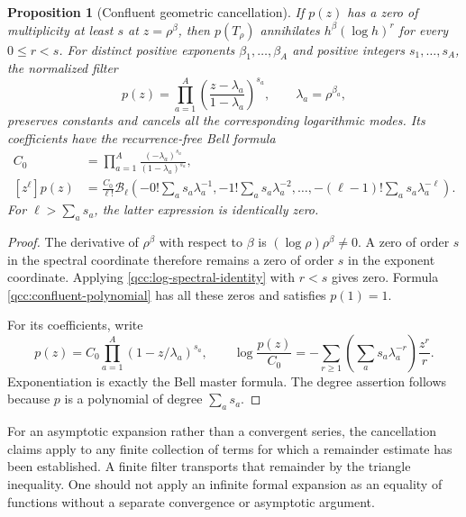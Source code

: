 \documentclass[11pt,a4paper,oneside,openany]{book}
\newtheorem{proposition}[theorem]{Proposition}
\theoremstyle{definition}
\theoremstyle{remark}
\newcommand{\Y}[1]{\mathcal B_{#1}}
\begin{document}
\begin{proposition}[Confluent geometric cancellation]
\label{qcc:confluent-filter}
If \(p(z)\) has a zero of multiplicity at least \(s\) at
\(z=\rho^\beta\), then \(p(T_\rho)\) annihilates
\(h^\beta(\log h)^r\) for every \(0\le r<s\).
For distinct positive exponents \(\beta_1,\ldots,\beta_A\) and positive
integers \(s_1,\ldots,s_A\), the normalized filter
\begin{equation}\label{qcc:confluent-polynomial}
 p(z)=\prod_{a=1}^{A}
        \left(\frac{z-\lambda_a}{1-\lambda_a}\right)^{s_a},
 \qquad\lambda_a=\rho^{\beta_a},
\end{equation}
preserves constants and cancels all the corresponding logarithmic modes.
Its coefficients have the recurrence-free Bell formula
\begin{align}
 C_0&=\prod_{a=1}^{A}
       \frac{(-\lambda_a)^{s_a}}{(1-\lambda_a)^{s_a}},
       \label{qcc:confluent-C}\\
 [z^\ell]p(z)&=\frac{C_0}{\ell!}
   \Y\ell\left(-0!\sum_a s_a\lambda_a^{-1},
                -1!\sum_a s_a\lambda_a^{-2},\ldots,
                -(\ell-1)!\sum_a s_a\lambda_a^{-\ell}\right).
       \label{qcc:confluent-Bell}
\end{align}
For \(\ell>\sum_a s_a\), the latter expression is identically zero.
\end{proposition}
\begin{proof}
The derivative of \(\rho^\beta\) with respect to \(\beta\) is
\((\log\rho)\rho^\beta\ne0\). A zero of order \(s\) in the
spectral coordinate therefore remains a zero of order \(s\) in the
exponent coordinate. Applying \eqref{qcc:log-spectral-identity} with
\(r<s\) gives zero. Formula \eqref{qcc:confluent-polynomial} has all
these zeros and satisfies \(p(1)=1\).

For its coefficients, write
\[
 p(z)=C_0\prod_{a=1}^{A}(1-z/\lambda_a)^{s_a},\qquad
 \log\frac{p(z)}{C_0}
   =-\sum_{r\ge1}\left(\sum_as_a\lambda_a^{-r}\right)\frac{z^r}{r}.
\]
Exponentiation is exactly the Bell master formula. The degree assertion follows
because \(p\) is a polynomial of degree \(\sum_as_a\).
\end{proof}

For an asymptotic expansion rather than a convergent series, the cancellation
claims apply to any finite collection of terms for which a remainder estimate
has been established. A finite filter transports that remainder by the triangle
inequality. One should not apply an infinite formal expansion as an equality of
functions without a separate convergence or asymptotic argument.
\end{document}

